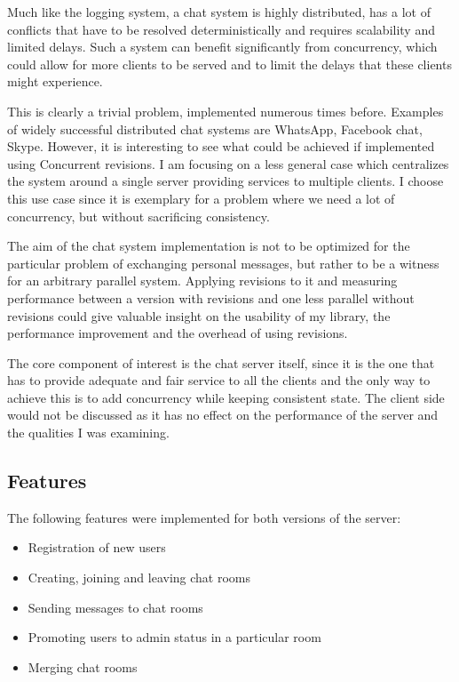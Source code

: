 \documentclass[12pt,twoside,notitlepage]{report}
\begin{document}
{Much like the logging system, a chat system is highly distributed, has a lot of conflicts that have to be resolved deterministically and requires scalability and limited delays. Such a system can benefit significantly from concurrency, which could allow for more clients to be served and to limit the delays that these clients might experience.

This is clearly a trivial problem, implemented numerous times before. Examples of widely successful distributed chat systems are WhatsApp, Facebook chat, Skype. However, it is interesting to see what could be achieved if implemented using Concurrent revisions. I am focusing on a less general case which centralizes the system around a single server providing services to multiple clients. I choose this use case since it is exemplary for a problem where we need a lot of concurrency, but without sacrificing consistency. 

The aim of the chat system implementation is not to be optimized for the particular problem of exchanging personal messages, but rather to be a witness for an arbitrary parallel system. Applying revisions to it and measuring performance between a version with revisions and one less parallel without revisions could give valuable insight on the usability of my library, the performance improvement and the overhead of using revisions. 

The core component of interest is the chat server itself, since it is the one that has to provide adequate and fair service to all the clients and the only way to achieve this is to add concurrency while keeping consistent state. The client side would not be discussed as it has no effect on the performance of the server and the qualities I was examining.

\subsection{Features}
The following features were implemented for both versions of the server:
\begin{itemize}
\item
Registration of new users
\item
Creating, joining and leaving chat rooms
\item 
Sending messages to chat rooms
\item
Promoting users to admin status in a particular room
\item
Merging chat rooms
\end{itemize}
  
}
\end{document}
